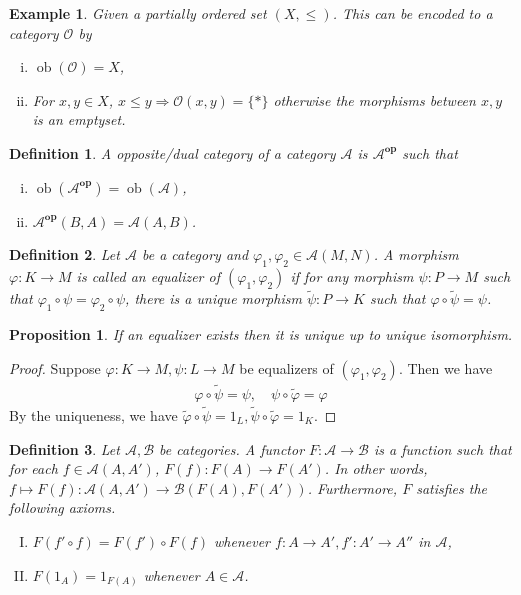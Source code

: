 \documentclass{article}
\newtheorem{proposition}{Proposition}[section]
\newtheorem{definition}{Definition}[section]
\newtheorem{example}{Example}[section]
\numberwithin{equation}{section}
\DeclareMathOperator{\ob}{ob}
\begin{document}
\begin{example}
\label{order_category}
Given a partially ordered set $(X,\leq)$. This can be encoded to a category $\mathcal{O}$ by
\begin{enumerate}[i).]
\item $\ob(\mathcal{O}) = X$,
\item For $x,y\in X$, $x\leq y\Rightarrow\mathcal{O}(x,y) = \{*\}$ otherwise the morphisms between $x,y$ is an emptyset.
\end{enumerate}
\end{example}

\begin{definition}
A opposite/dual category of a category $\mathcal{A}$ is $\mathcal{A}^{\textbf{op}}$ such that
\begin{enumerate}[i).]
\item $\ob(\mathcal{A}^{\textbf{op}})=\ob(\mathcal{A})$,
\item $\mathcal{A}^{\textbf{op}}(B,A) = \mathcal{A}(A,B)$.
\end{enumerate}
\end{definition}

\begin{definition}
Let $\mathcal{A}$ be a category and $\varphi_1,\varphi_2\in\mathcal{A}(M,N)$. A morphism $\varphi:K\to M$ is called an equalizer of $(\varphi_1,\varphi_2)$ if for any morphism $\psi:P\to M$ such that
$\varphi_1\circ\psi=\varphi_2\circ\psi$, there is a unique morphism $\tilde{\psi}:P\to K$ such that $\varphi\circ\tilde{\psi}=\psi$.
\end{definition}

\begin{proposition}
If an equalizer exists then it is unique up to unique isomorphism.
\end{proposition}

\begin{proof}
Suppose $\varphi:K\to M,\psi:L\to M$ be equalizers of $(\varphi_1,\varphi_2)$. Then we have
\begin{align*}
\varphi\circ\tilde{\psi}=\psi,\quad\psi\circ\tilde{\varphi}=\varphi
\end{align*}
By the uniqueness, we have $\tilde{\varphi}\circ\tilde{\psi} = 1_L,\tilde{\psi}\circ\tilde{\varphi} = 1_K$. 
\end{proof}

\begin{definition}
Let $\mathcal{A},\mathcal{B}$ be categories. A functor $F:\mathcal{A}\to\mathcal{B}$ is a function such that for each $f\in\mathcal{A}(A,A')$, $F(f):F(A)\to F(A')$. In other words, $f\mapsto F(f):\mathcal{A}(A,A')\to\mathcal{B}(F(A),F(A'))$. Furthermore, $F$ satisfies the following axioms.
\begin{enumerate}[I).]
\item $F(f'\circ f) = F(f')\circ F(f)$ whenever $f:A\to A',f':A'\to A''$ in $\mathcal{A}$,
\item $F(1_A) = 1_{F(A)}$ whenever $A\in\mathcal{A}$. 
\end{enumerate}
\end{definition}
\end{document}
